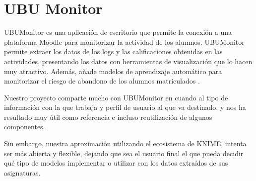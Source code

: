 
\section{UBU Monitor}

UBUMonitor es una aplicación de escritorio que permite la conexión a una plataforma Moodle para monitorizar la actividad
de los alumnos. UBUMonitor permite extraer los datos de los logs y las calificaciones obtenidas en las actividades, presentando 
los datos con herramientas de visualización que lo hacen muy atractivo. Además, añade modelos de aprendizaje automático 
para monitorizar el riesgo de abandono de los alumnos matriculados \cite{ubumonitor}. 
\

Nuestro proyecto comparte mucho con UBUMonitor en cuando al tipo de información con la que trabaja y perfil de usuario al que
 va destinado, y nos ha resultado muy útil como referencia e incluso reutilización de algunos componentes. 
\

Sin embargo, nuestra aproximación utilizando el ecosistema de KNIME, intenta ser más abierta y flexible, dejando que sea 
el usuario final el que pueda decidir qué tipo de modelos implementar o utilizar con los datos extraídos de sus asignaturas. 


